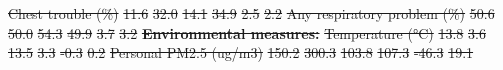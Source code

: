 \documentclass[
  letterpaper,
  DIV=11,
  numbers=noendperiod]{scrartcl}
\makeatletter
\renewenvironment{table}%
   {\renewcommand\familydefault\sfdefault
    \@float{table}}
   {\end@float}
\providecommand{\DIFadd}[1]{{\protect\color{blue}\underline{#1}}} %
\providecommand{\DIFdel}[1]{{\protect\color{red}\sout{#1}}}                      %
\providecommand{\DIFaddFL}[1]{\DIFadd{#1}} %
\providecommand{\DIFdelFL}[1]{\DIFdel{#1}} %
\providecommand{\DIFaddbeginFL}{} %
\providecommand{\DIFdelendFL}{} %
\newcommand{\DIFaddincludegraphics}[2][]{{\color{blue}\fbox{\DIFOincludegraphics[#1]{#2}}}} %
\DeclareRobustCommand{\DIFaddbeginFL}{\DIFOaddbeginFL \let\includegraphics\DIFaddincludegraphics} %
\DeclareRobustCommand{\DIFdelendFL}{\DIFOaddendFL \let\includegraphics\DIFOincludegraphics} %
\makeatother
\begin{document}
\begin{table}
\DIFdelFL{Chest trouble (\%) }%
\DIFdelFL{11.6 }%
\DIFdelFL{32.0 }%
\DIFdelFL{14.1 }%
\DIFdelFL{34.9 }%
\DIFdelFL{2.5 }%
\DIFdelFL{2.2}%
\DIFdelFL{Any respiratory problem (\%) }%
\DIFdelFL{50.6 }%
\DIFdelFL{50.0 }%
\DIFdelFL{54.3 }%
\DIFdelFL{49.9 }%
\DIFdelFL{3.7 }%
\DIFdelFL{3.2}%
\textbf{\DIFdelFL{Environmental measures:}} %
\textbf{} %
\textbf{} %
\textbf{} %
\textbf{} %
\textbf{} %
\textbf{}%
\DIFdelFL{Temperature (°C) }%
\DIFdelFL{13.8 }%
\DIFdelFL{3.6 }%
\DIFdelFL{13.5 }%
\DIFdelFL{3.3 }%
\DIFdelFL{-0.3 }%
\DIFdelFL{0.2}%
\DIFdelFL{Personal PM2.5 (ug/m3) }%
\DIFdelFL{150.2 }%
\DIFdelFL{300.3 }%
\DIFdelFL{103.8 }%
\DIFdelFL{107.3 }%
\DIFdelFL{-46.3 }%
\DIFdelFL{19.1}%
\DIFdelendFL \DIFaddbeginFL \caption{\label{tbl-desc}\DIFaddFL{Descriptive statistics for selected
demographic, health, and environmental measures at baseline, by
treatment status.}}

\centering{

}
\end{table}
\end{document}

